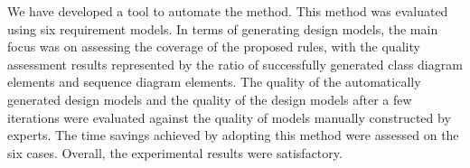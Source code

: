 \documentclass[pdflatex,sn-mathphys-num]{sn-jnl}%
\theoremstyle{thmstyleone}%
\theoremstyle{thmstyletwo}%
\theoremstyle{thmstylethree}%
\begin{document}
We have developed a tool to automate the method. This method was evaluated using six requirement models. In terms of generating design models, the main focus was on assessing the coverage of the proposed rules, with the quality assessment results represented by the ratio of successfully generated class diagram elements and sequence diagram elements. The quality of the automatically generated design models and the quality of the design models after a few iterations were evaluated against the quality of models manually constructed by experts. The time savings achieved by adopting this method were assessed on the six cases. Overall, the experimental results were satisfactory.

\end{document}
